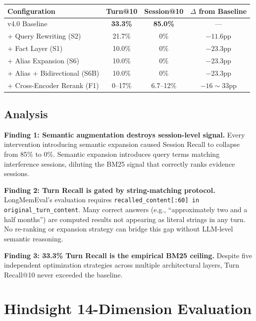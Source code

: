 \documentclass[11pt,a4paper]{article}
\begin{document}
\begin{table}[h]
\centering
\begin{tabular}{lccc}
\toprule
\textbf{Configuration} & \textbf{Turn@10} & \textbf{Session@10} & \textbf{$\Delta$ from Baseline} \\
\midrule
v4.0 Baseline & \textbf{33.3\%} & \textbf{85.0\%} & --- \\
+ Query Rewriting (S2) & 21.7\% & 0\% & $-11.6$pp \\
+ Fact Layer (S1) & 10.0\% & 0\% & $-23.3$pp \\
+ Alias Expansion (S6) & 10.0\% & 0\% & $-23.3$pp \\
+ Alias + Bidirectional (S6B) & 10.0\% & 0\% & $-23.3$pp \\
+ Cross-Encoder Rerank (F1) & 0--17\% & 6.7--12\% & $-16\sim33$pp \\
\bottomrule
\end{tabular}
\end{table}

\subsection{Analysis}

\textbf{Finding 1: Semantic augmentation destroys session-level signal.} Every intervention introducing semantic expansion caused Session Recall to collapse from 85\% to 0\%. Semantic expansion introduces query terms matching interference sessions, diluting the BM25 signal that correctly ranks evidence sessions.

\textbf{Finding 2: Turn Recall is gated by string-matching protocol.} LongMemEval's evaluation requires \texttt{recalled\_content[:60] in original\_turn\_content}. Many correct answers (e.g., ``approximately two and a half months'') are computed results not appearing as literal strings in any turn. No re-ranking or expansion strategy can bridge this gap without LLM-level semantic reasoning.

\textbf{Finding 3: 33.3\% Turn Recall is the empirical BM25 ceiling.} Despite five independent optimization strategies across multiple architectural layers, Turn Recall@10 never exceeded the baseline.

\section{Hindsight 14-Dimension Evaluation}
\end{document}
